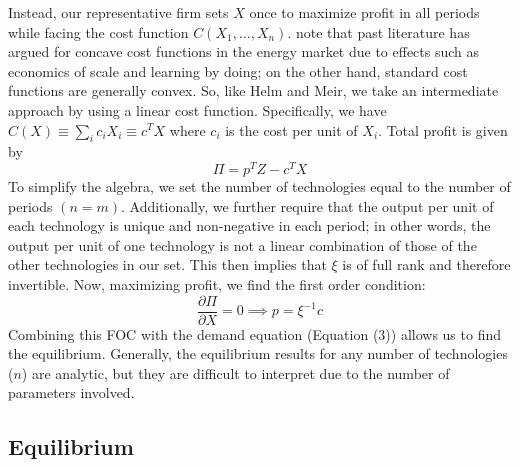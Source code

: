 \documentclass[11pt,a4paper]{extarticle}
\begin{document}
Instead, our representative firm sets $X$ once to maximize profit in all periods while facing the cost function $C(X_1, \dots, X_n)$.  \citet{HH} note that past literature has argued for concave cost functions in the energy market due to effects such as economics of scale and learning by doing; on the other hand, standard cost functions are generally convex. So, like Helm and Meir, we take an intermediate approach by using a linear cost function. Specifically, we have $C(X) \equiv \sum_i c_i X_i \equiv c^T X$ where $c_i$ is the cost per unit of $X_i$. Total profit is given by 
\begin{equation}
\Pi = p^T Z - c^T X
\end{equation}
To simplify the algebra, we set the number of technologies equal to the number of periods $(n=m)$. Additionally, we further require that the output per unit of each technology is unique and non-negative in each period; in other words, the output per unit of one technology is not a linear combination of those of the other technologies in our set. This then implies that $\xi$ is of full rank and therefore invertible.  Now, maximizing profit, we find the first order condition:
\begin{equation}
\frac{\partial \Pi}{\partial X} = 0 \implies p = \xi^{-1} c
\end{equation}
Combining this FOC with the demand equation (Equation (3)) allows us to find the equilibrium. Generally, the equilibrium results for any number of technologies ($n$) are analytic, but they are difficult to interpret due to the number of parameters involved. 

\subsection{Equilibrium}
\end{document}
